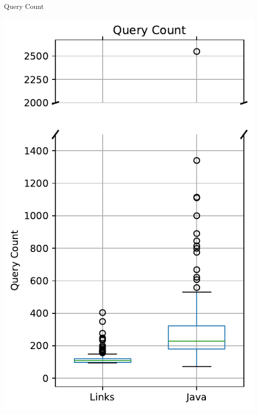 \documentclass[11.5pt, aspectratio=169]{beamer}
\begin{document}
\begin{frame}{Query Count}

  \begin{minipage}{0.28\textwidth}
    \centering
    \includegraphics[scale=0.4]{images/objectdisplay_querycount_box.pdf}


\end{minipage}
\end{frame}
\end{document}
